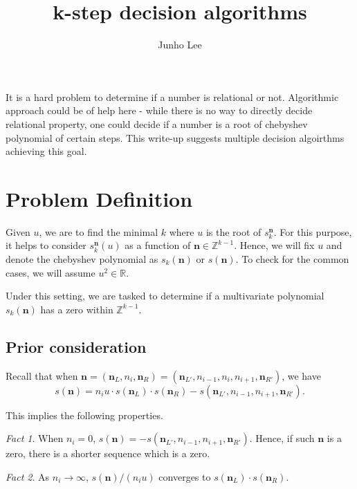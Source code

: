 \documentclass{article}
\title{k-step decision algorithms}
\author{Junho Lee}
\theoremstyle{definition}
\theoremstyle{plain}
\theoremstyle{remark}
\newtheorem*{fact}{Fact}
\numberwithin{equation}{section}
\newcommand{\integer}{\mathbb{Z}}
\newcommand{\real}{\mathbb{R}}
\begin{document}
\pagecolor{white}
\color{black}
\maketitle

It is a hard problem to determine if a number is relational or not.
Algorithmic approach could be of help here -
while there is no way to directly decide relational property,
one could decide if a number is a root of chebyshev polynomial of certain steps.
This write-up suggests multiple decision algoirthms achieving this goal.

\section{Problem Definition}

Given $u$, we are to find the minimal $k$ where $u$ is the root of $s^{\mathbf{n}}_k$.
For this purpose, it helps to consider $s^{\mathbf{n}}_k(u)$ as a function of $\mathbf{n} \in \integer^{k-1}$.
Hence, we will fix $u$ and denote the chebyshev polynomial as $s_k(\mathbf{n})$ or $s(\mathbf{n})$.
To check for the common cases, we will assume $u^2 \in \real$.

Under this setting, we are tasked to determine if a multivariate polynomial $s_k(\mathbf{n})$
has a zero within $\integer^{k-1}$.

\subsection{Prior consideration}

Recall that when $\mathbf{n} = (\mathbf{n}_L, n_i, \mathbf{n}_R)
  = (\mathbf{n}_{L'}, n_{i-1}, n_i, n_{i+1}, \mathbf{n}_{R'})$,
we have
\begin{equation}\label{key_equation}
  s(\mathbf{n}) =
  n_i u \cdot s(\mathbf{n}_L) \cdot s(\mathbf{n}_R)
  - s(\mathbf{n}_{L'}, n_{i-1}, n_{i+1}, \mathbf{n}_{R'}).
\end{equation}

This implies the following properties.
\begin{fact}
  When $n_i = 0$, $s(\mathbf{n}) = - s(\mathbf{n}_{L'}, n_{i-1}, n_{i+1}, \mathbf{n}_{R'})$.
  Hence, if such $\mathbf{n}$ is a zero, there is a shorter sequence which is a zero.
\end{fact}
\begin{fact}
  As $n_i \to \infty$, $s(\mathbf{n}) / (n_i u)$ converges to $s(\mathbf{n}_L) \cdot s(\mathbf{n}_R)$.
\end{fact}
\end{document}
